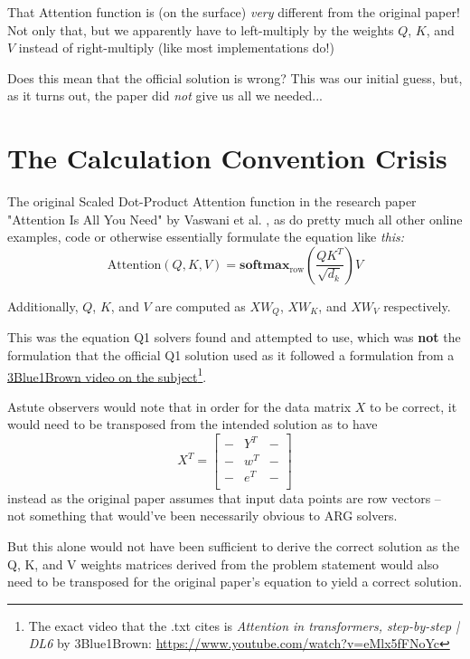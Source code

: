 \documentclass{article}
\begin{document}
That Attention function is (on the surface) \emph{very} different from the original paper! Not only that, but we apparently have to left-multiply by the weights $Q$, $K$, and $V$ instead of right-multiply (like most implementations do!)

Does this mean that the official solution is wrong? This was our initial guess, but, as it turns out, the paper did \emph{not} give us all we needed...

\section{The Calculation Convention Crisis}
The original Scaled Dot-Product Attention function in the research paper "Attention Is All You Need" by Vaswani et al. \cite{aiayn}, as do pretty much all other online examples, code or otherwise essentially formulate the equation like \textit{this:}
\[\text{Attention}(Q, K, V) = \mathbf{softmax}_{\text{row}}\left(\frac{QK^T}{\sqrt{d_k}}\right)V\]

Additionally, $Q$, $K$, and $V$ are computed as $XW_Q$, $XW_K$, and $XW_V$ respectively. 

This was the equation Q1 solvers found and attempted to use, which was \textbf{not} the formulation that the official Q1 solution used as it followed a formulation from a \href{https://www.youtube.com/watch?v=eMlx5fFNoYc}{3Blue1Brown video on the subject}\footnote{The exact video that the .txt cites is \emph{Attention in transformers, step-by-step | DL6} by 3Blue1Brown: \href{https://www.youtube.com/watch?v=eMlx5fFNoYc}{https://www.youtube.com/watch?v=eMlx5fFNoYc}}.


Astute observers would note that in order for the data matrix $X$ to be correct, it would need to be transposed from the intended solution as to have
\[
X^T = \begin{bmatrix}
- & Y^T & - \\
- & w^T & - \\
- & e^T & - \\
\end{bmatrix}
\]
instead as the original paper assumes that input data points are row vectors -- not something that would've been necessarily obvious to ARG solvers. 

But this alone would not have been sufficient to derive the correct solution as the Q, K, and V weights matrices derived from the problem statement would also need to be transposed for the original paper's equation to yield a correct solution.
\end{document}
